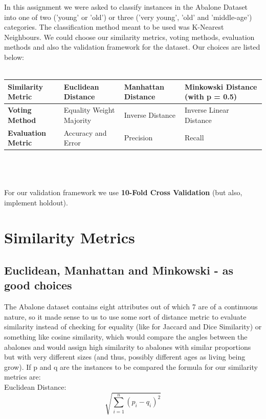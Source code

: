 In this assignment we were asked to classify instances in the Abalone Dataset into one of two 
('young' or 'old') or three ('very young', 'old' and 'middle-age') categories. The classification method meant to be used was K-Nearest Neighbours. We could choose our similarity metrics, voting methods, evaluation methods and also the validation framework for the dataset. Our choices are listed below:
\\\\
{\centering
\begin{tabular}{|p{3.5cm}||p{3.5cm}|p{3.5cm}|p{3.75cm}|}
 \hline
 {\bf Similarity Metric} & Euclidean Distance & Manhattan Distance & Minkowski Distance (with p = 0.5)\\
 \hline
 {\bf Voting Method} & Equality Weight Majority & Inverse Distance & Inverse Linear Distance \\ 
 \hline
 {\bf Evaluation Metric} & Accuracy and Error & Precision & Recall \\ 
 \hline
\end{tabular} }
\\\\ \\
For our validation framework we use {\bf 10-Fold Cross Validation} (but also, implement holdout). 

 

\section{Similarity Metrics}

\subsection{Euclidean, Manhattan and Minkowski - as good choices}

The Abalone dataset contains eight attributes out of which 7 are of a continuous nature, so it made sense to us to use some sort of distance metric to evaluate similarity instead of checking for equality  (like for Jaccard and Dice Similarity) or something like cosine similarity, which would compare the angles between the abalones and would assign high similarity to abalones with similar proportions but with very different sizes (and thus, possibly different ages as living being grow). If p and q are the instances to be compared the formula for our similarity metrics are: \\

Euclidean Distance:
\begin{equation}
\sqrt{\sum_{i=1}^{n} (p_{i} - q_{i})^{2}}
\end{equation}

